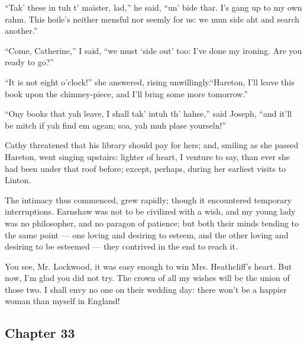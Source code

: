 \par “Tak' these in tuh t' maister, lad,” he said, “un' bide thar. I's gang up to my own rahm. This hoile's neither mensful nor seemly for us: we mun side aht and search another.”
\par “Come, Catherine,” I said, “we must ‘side out' too: I've done my ironing. Are you ready to go?”
\par “It is not eight o'clock!” she answered, rising unwillingly.“Hareton, I'll leave this book upon the chimney-piece, and I'll bring some more tomorrow.”
\par “Ony books that yah leave, I shall tak' intuh th' hahse,” said Joseph, “and it'll be mitch if yah find em agean; soa, yah muh plase yourseln!”
\par Cathy threatened that his library should pay for hers; and, smiling as she passed Hareton, went singing upstairs: lighter of heart, I venture to say, than ever she had been under that roof before; except, perhaps, during her earliest visits to Linton.
\par The intimacy thus commenced, grew rapidly; though it encountered temporary interruptions. Earnshaw was not to be civilized with a wish, and my young lady was no philosopher, and no paragon of patience; but both their minds tending to the same point — one loving and desiring to esteem, and the other loving and desiring to be esteemed — they contrived in the end to reach it.
\par You see, Mr. Lockwood, it was easy enough to win Mrs. Heathcliff's heart. But now, I'm glad you did not try. The crown of all my wishes will be the union of those two. I shall envy no one on their wedding day: there won't be a happier woman than myself in England!






\subsection*{Chapter 33}

